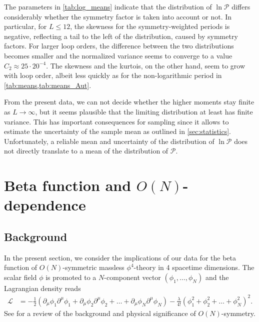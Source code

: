 \documentclass[11pt,a4paper]{article}
\newcommand{\period}{\mathcal P}
\renewcommand{\|}{\rule[-0.4ex]{0.2ex}{1.2em}}
\begin{document}
The parameters in \cref{tab:log_means} indicate that  the distribution of $\ln \period$ differs considerably whether the symmetry factor is taken into account or not. In particular, for $L\leq 12$, the skewness for the symmetry-weighted periods is negative, reflecting a tail to the left of the distribution, caused by symmetry factors. For larger loop orders, the difference between the two distributions becomes smaller and the normalized variance seems to converge to a value $C_2 \approx 25 \cdot 20^{-4}$. The skewness and the kurtois, on the other hand, seem to grow with loop order, albeit less quickly as for the non-logarithmic period in \cref{tab:means,tab:means_Aut}. 

From the present data, we can not decide whether the higher moments stay finite as $L\rightarrow\infty$, but it seems plausible that the limiting distribution at least has finite variance. This has important consequences for sampling since it allows to estimate the uncertainty of the sample mean as outlined in \cref{sec:statistics}. Unfortunately, a reliable mean and uncertainty of the distribution of $\ln \period$ does not directly translate to a mean of the distribution of $\period$. 










\FloatBarrier




\section[Beta function and O(N)-dependence]{Beta function and $O(N)$-dependence}\label{sec:beta}


\subsection{Background}\label{sec:beta_background}




In the present section, we consider the implications of our data for the beta function of $O(N)$-symmetric massless $\phi^4$-theory in 4 spacetime dimensions. The scalar field $\phi$ is promoted to a $N$-component vector $(\phi_1, \ldots, \phi_N)$ and the Lagrangian density reads
\begin{align}\label{lagrangian_phi4}
\mathcal L &= -\frac 12 \left( \partial_\mu \phi_1 \partial^\mu \phi_1 + \partial_\mu \phi_2 \partial^\mu \phi_2 + \ldots + \partial_\mu \phi_N \partial^\mu \phi_N \right)- \frac{\lambda}{4!} \left( \phi_1^2 + \phi_2^2 + \ldots + \phi_N^2 \right) ^2.
\end{align}
See \cite{pelissetto_critical_2002} for a review of the background and physical significance of $O(N)$-symmetry.
\end{document}
